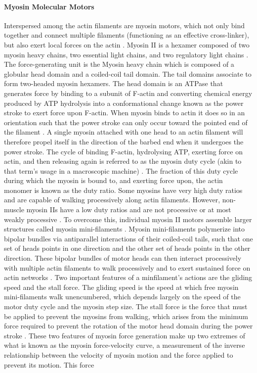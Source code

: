 \paragraph{Myosin Molecular Motors} Interspersed among the actin filaments are myosin motors, which not only bind together and connect multiple filaments (functioning as an effective cross-linker), but also exert local forces on the actin \cite{Vicente-Manzanares2009,howard2001mechanics}.  Myosin II is a hexamer composed of two myosin heavy chains, two essential light chains, and two regulatory light chains \cite{Vicente-Manzanares2009}. The force-generating unit is the Myosin heavy chain which is composed of a globular head domain and a coiled-coil tail domain.  The tail domains associate to form two-headed myosin hexamers. The head domain is an ATPase that  generates force by binding to a subunit of F-actin and converting chemical energy produced by ATP hydrolysis into a conformational change known as the power stroke to exert force upon F-actin. When myosin binds to actin it does so in an orientation such that the power stroke can only occur toward the pointed end of the filament \cite{howard2001mechanics}. A single myosin attached with one head to an actin filament will therefore propel itself in the direction of the barbed end when it undergoes the power stroke. The cycle of binding F-actin, hydrolysing ATP, exerting force on actin, and then releasing again is referred to as the myosin duty cycle (akin to that term's usage in a macroscopic machine) \cite{Vicente-Manzanares2009}.  The fraction of this duty cycle during which the myosin is bound to, and exerting force upon, the actin monomer is known as the duty ratio. Some myosins have very high duty ratios and are capable of walking processively along actin filaments. However, non-muscle myosin IIs have a low duty ratios and are not processive \cite{Vicente-Manzanares2009,howard2001mechanics} or at most weakly processive \cite{Hundt2016,Norstrom20082010}.  To overcome this, individual myosin II motors assemble larger structures called myosin mini-filaments \cite{egelhoff93}. Myosin mini-filaments polymerize into bipolar bundles via antiparallel interactions of their coiled-coil tails, such that one set of heads points in one direction and the other set of heads points in the other direction. These bipolar bundles of motor heads can then interact processively with multiple actin filaments  to walk processively and to exert sustained force on actin networks \cite{Bing2000}. Two important features of a minfilament's actions are the gliding speed and the stall force. The gliding speed is the speed at which free myosin mini-filaments walk unencumbered, which depends largely on the speed of the motor duty cycle and the myosin step size.  The stall force is the force that must be applied to prevent the myosins from walking, which arises from the minimum force required to prevent the rotation of the motor head domain during the power stroke \cite{Bing2000}.  These two features of myosin force generation make up two extremes of what is known as the myosin force-velocity curve, a measurement of the inverse relationship between the velocity of myosin motion and the force applied to prevent its motion.  This force 